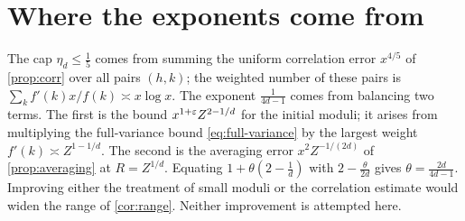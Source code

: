 \section{Where the exponents come from}

The cap $\eta_d\le\frac15$ comes from summing the uniform correlation error $x^{4/5}$ of \cref{prop:corr} over all pairs $(h,k)$; the weighted number of these pairs is $\sum_kf'(k)x/f(k)\asymp x\log x$. The exponent $\frac1{4d-1}$ comes from balancing two terms. The first is the bound $x^{1+\varepsilon}Z^{2-1/d}$ for the initial moduli; it arises from multiplying the full-variance bound \eqref{eq:full-variance} by the largest weight $f'(k)\asymp Z^{1-1/d}$. The second is the averaging error $x^2Z^{-1/(2d)}$ of \cref{prop:averaging} at $R=Z^{1/d}$. Equating $1+\theta(2-\frac1d)$ with $2-\frac\theta{2d}$ gives $\theta=\frac{2d}{4d-1}$. Improving either the treatment of small moduli or the correlation estimate would widen the range of \cref{cor:range}. Neither improvement is attempted here.
